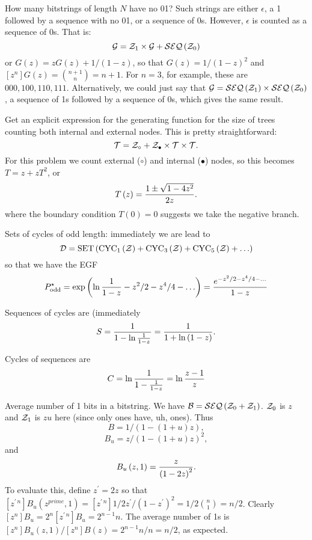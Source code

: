  How many bitstrings of
length $N$ have no 01?\hfil\break
Such strings are either $\epsilon$, a 1 followed by a sequence with no 01,
or a sequence of 0s.  However, $\epsilon$ is counted as a sequence of 0s. That is:
$$
 {\cal G} = {\cal Z}_1 \times {\cal G} + {\cal SEQ}\left({\cal Z}_0\right)
$$
or $G\left(z\right) = z G\left(z\right) + 1 /\left( 1 - z \right) $, so that
$G\left(z\right) = 1 / \left(1 - z\right)^2$ and $\left[z^n\right] G\left(z\right) =
{n + 1 \choose n} = n + 1$.  For $n=3$, for example, these are
$000, 100, 110, 111$.  Alternatively, we could just say that
${\cal G} = {\cal SEQ}\left({\cal Z}_1\right) \times {\cal SEQ}\left({\cal Z}_0\right)$,
a sequence of 1s followed by a sequence of 0s, which gives the same result.

 Get an explicit expression for the 
generating function for the size of trees counting both internal and external nodes.
This is pretty straightforward: 
$$
 {\cal T} = {\cal Z}_{\circ} + {\cal Z}_{\bullet} \times {\cal T} \times {\cal T}.
$$
For this problem we count external ($\circ$) and internal ($\bullet$) nodes,
so this becomes $T = z + z T^2$, or
$$
 T\left(z\right) = {1 \pm \sqrt{1 - 4 z^2} \over 2 z}.
$$
where the boundary condition $T\left(0\right) = 0$ suggests we take the negative branch.

 Sets of cycles of odd length:
immediately we are lead to 
$$
{\cal D} = {\rm SET} \left(
{\rm CYC}_1\left({\cal Z}\right) + {\rm CYC}_3 \left({\cal Z}\right) +
 {\rm CYC}_5 \left({\cal Z}\right) + \ldots \right)
 $$
 so that we have the EGF
 $$
 P^{\star}_{\rm odd} = \exp \left( \ln {1 \over 1 - z } - z^2/2 - z^4/4 - \ldots\right)
  = { e^{-z^2/2 - z^4/4 - \ldots} \over 1 - z }
$$

 Sequences of cycles are (immediately
$$
  S = {1 \over {1 - \ln {1 \over 1 - z}}} = {1 \over 1 + \ln \left(1 - z\right)}.
$$

\vskip 0.08in  Cycles of sequences are
$$
 C = \ln {1 \over {1 - {1 \over 1 - z}}} = \ln {z - 1 \over z}
$$

 Average number of 1 bits in a bitstring.\hfil\break
We have ${\cal B} = {\cal SEQ}\left({\cal Z}_0 + {\cal Z}_1\right)$.  ${\cal Z}_0$
is $z$ and ${\cal Z}_1$ is $zu$ here (since only ones have, uh, ones).
Thus 
$$
 B = 1 / \left(1 - \left(1 + u\right) z\right),
$$
$$
B_u = z / \left(1 - \left(1 + u\right) z\right)^2 ,
$$ 
and
$$
 B_u\left(z, 1\right) = {z \over \left(1 - 2 z\right)^2} .
$$
To evaluate this, define $z^{\prime} = 2 z$ so that $\left[z^{\prime\,n}\right] B_u\left(z^{prime},1\right) =
\left[z^{\prime\, n}\right] 1/2 z^{\prime} / \left(1 - z^{\prime}\right)^2 = 1 / 2 {n \choose 1} = n / 2$.
Clearly $\left[z^n\right] B_u = 2^n \left[z^{\prime\,n}\right] B_u = 2^{n-1} n$.  The
average number of 1s is $\left[z^n\right] B_u\left(z, 1\right) / \left[z^n\right] B\left(z\right) =
2^{n-1} n / n = n / 2$, as expected.

